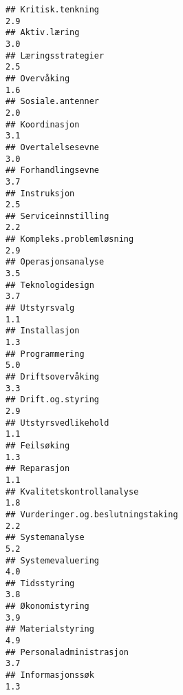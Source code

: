 \documentclass[
]{article}
\begin{document}
\begin{verbatim}
## Kritisk.tenkning                                                                 2.9
## Aktiv.læring                                                                     3.0
## Læringsstrategier                                                                2.5
## Overvåking                                                                       1.6
## Sosiale.antenner                                                                 2.0
## Koordinasjon                                                                     3.1
## Overtalelsesevne                                                                 3.0
## Forhandlingsevne                                                                 3.7
## Instruksjon                                                                      2.5
## Serviceinnstilling                                                               2.2
## Kompleks.problemløsning                                                          2.9
## Operasjonsanalyse                                                                3.5
## Teknologidesign                                                                  3.7
## Utstyrsvalg                                                                      1.1
## Installasjon                                                                     1.3
## Programmering                                                                    5.0
## Driftsovervåking                                                                 3.3
## Drift.og.styring                                                                 2.9
## Utstyrsvedlikehold                                                               1.1
## Feilsøking                                                                       1.3
## Reparasjon                                                                       1.1
## Kvalitetskontrollanalyse                                                         1.8
## Vurderinger.og.beslutningstaking                                                 2.2
## Systemanalyse                                                                    5.2
## Systemevaluering                                                                 4.0
## Tidsstyring                                                                      3.8
## Økonomistyring                                                                   3.9
## Materialstyring                                                                  4.9
## Personaladministrasjon                                                           3.7
## Informasjonssøk                                                                  1.3

\end{verbatim}
\end{document}
